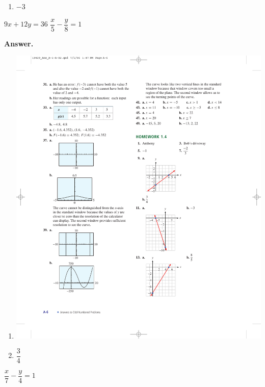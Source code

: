 \documentclass[10pt,]{book}
\theoremstyle{plain}
\theoremstyle{definition}
\theoremstyle{definition}
\theoremstyle{definition}
\theoremstyle{definition}
\numberwithin{equation}{part}
\begin{document}
\begin{exercisegroup}
\begin{enumerate}[label=*\alph**]
%
\item\hypertarget{li-938}{}\(-3\)%
\end{enumerate}
%
\exercise[12.]\hypertarget{exercise-227}{}\(9x + 12y = 36\)%
\exercise[13.]\hypertarget{exercise-228}{}\(\dfrac{x}{5}- \dfrac{y}{8}= 1\)%
\par\smallskip
\noindent\textbf{Answer.}\hypertarget{answer-132}{}\quad
\leavevmode%
\begin{enumerate}[label=*\alph**]
\item\hypertarget{li-939}{}\includegraphics[width=0.6\linewidth]{images/fig-ans-1-4-13}
%
\item\hypertarget{li-940}{}\(\dfrac{3}{4} \)%
\end{enumerate}
%
\exercise[14.]\hypertarget{exercise-229}{}\(\dfrac{x}{7}- \dfrac{y}{4}= 1\)%
\end{exercisegroup}
\par\smallskip\noindent
\end{document}
